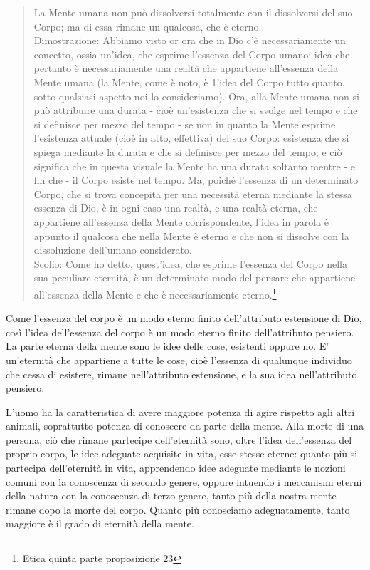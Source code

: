 \begin{quotation}
	\small La Mente umana non può dissolversi totalmente con il dissolversi del suo Corpo; ma di essa rimane un qualcosa, che è eterno.\\
	Dimostrazione: Abbiamo visto or ora che in Dio c’è necessariamente un concetto, ossia
	un’idea, che esprime l’essenza del Corpo umano: idea che pertanto è necessariamente una
	realtà che appartiene all’essenza della Mente umana (la Mente, come è noto, è 1’idea del
	Corpo tutto quanto, sotto qualsiasi aspetto noi lo consideriamo). Ora, alla Mente umana
	non si può attribuire una durata - cioè un’esistenza che si svolge nel tempo e che si definisce per mezzo del tempo - se non in quanto la Mente esprime l’esistenza attuale (cioè in atto, effettiva) del suo Corpo: esistenza che si spiega mediante la durata e che si definisce per
	mezzo del tempo; e ciò significa che in questa visuale la Mente ha una durata soltanto mentre - e fin che - il Corpo esiste nel tempo. Ma, poiché l’essenza di un determinato Corpo,
	che si trova concepita per una necessità eterna mediante la stessa essenza di Dio, è in ogni
	caso una realtà, e una realtà eterna, che appartiene all’essenza della Mente corrispondente, l’idea in parola è appunto il qualcosa che nella Mente è eterno e che non si dissolve con
	la dissoluzione dell’umano considerato.\\
	Scolio: Come ho detto, quest’idea, che esprime l’essenza del Corpo nella sua peculiare eternità, è un determinato modo del pensare che appartiene all’essenza della Mente e
	che è necessariamente eterno.\footnote{Etica quinta parte proposizione 23}
\end{quotation}

Come l'essenza del corpo è un modo eterno finito dell'attributo estensione di Dio, così l'idea dell'essenza del corpo è un modo eterno finito dell'attributo pensiero. La parte eterna della mente sono le idee delle cose, esistenti oppure no. E' un'eternità che appartiene a tutte le cose, cioè l'essenza di qualunque individuo che cessa di esistere, rimane nell'attributo estensione, e la sua idea nell'attributo pensiero.


L'uomo ha la caratteristica di avere maggiore potenza di agire rispetto agli altri animali, soprattutto potenza di conoscere da parte della mente. Alla morte di una persona, ciò che rimane partecipe dell'eternità sono, oltre l'idea dell'essenza del proprio corpo, le idee adeguate acquisite in vita, esse stesse eterne: quanto più si partecipa dell'eternità in vita, apprendendo idee adeguate mediante le nozioni comuni con la conoscenza di secondo genere, oppure intuendo i meccanismi eterni della natura con la conoscenza di terzo genere, tanto più della nostra mente rimane dopo la morte del corpo. Quanto più conosciamo adeguatamente, tanto maggiore è il grado di eternità della mente.

